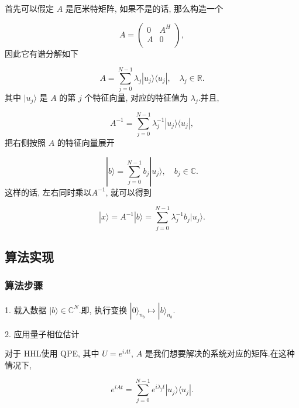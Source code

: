 首先可以假定 $A$ 是厄米特矩阵, 如果不是的话, 那么构造一个

\begin{equation}
	A=\left( \begin{array}{cc}
		0 & A^H \\
		A & 0 \\
	\end{array} \right),
\end{equation}
因此它有谱分解如下

\begin{equation}
	A=\sum_{j=0}^{N-1}\lambda_j|u_j\rangle\langle u_j|, \quad \lambda_j \in \mathbb{R}.
\end{equation}
其中 $|u_j\rangle$ 是 $A$ 的第 $j$ 个特征向量, 对应的特征值为 $\lambda_j$.并且, 

\begin{equation}
	A^{-1}=\sum_{j=0}^{N-1}\lambda_j^{-1}|u_j\rangle\langle u_j|,
\end{equation}
把右侧按照 $A$ 的特征向量展开

\begin{equation}
	|b\rangle = \sum_{j=0}^{N-1}b_j|u_j\rangle, \quad b_j \in \mathbb{C}.
\end{equation}
这样的话, 左右同时乘以$A^{-1}$, 就可以得到

\begin{equation}
	|x\rangle = A^{-1}|b\rangle = \sum_{j=0}^{N-1}\lambda_j^{-1}b_j|u_j\rangle.
\end{equation}

\subsection{算法实现}
\subsubsection{算法步骤}
1. 载入数据 $|b\rangle \in \mathbb{ C }^{N}$.即, 执行变换
$ |0\rangle _{n_{b}} \mapsto |b\rangle _{n_{b}} $.\par
2. 应用量子相位估计

对于 HHL使用 QPE, 其中 $U = e^{iAt}$, $A$ 是我们想要解决的系统对应的矩阵.在这种情况下, 

\begin{equation}
	e^{iAt} = \sum_{j=0}^{N-1}e^{i\lambda_{j}t}|u_{j}\rangle\langle u_{j}|.
\end{equation}

